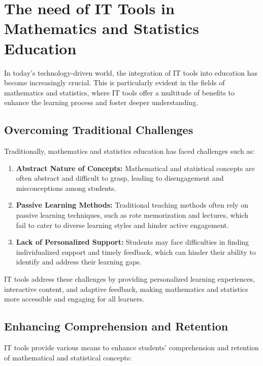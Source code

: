 \documentclass[20pt]{report}
\begin{document}
\section{The need of IT Tools in Mathematics and Statistics Education}

In today's technology-driven world, the integration of IT tools into education has become increasingly crucial. This is particularly evident in the fields of mathematics and statistics, where IT tools offer a multitude of benefits to enhance the learning process and foster deeper understanding.

\subsection{Overcoming Traditional Challenges}

Traditionally, mathematics and statistics education has faced challenges such as:

\begin{enumerate}

\item \textbf{Abstract Nature of Concepts:} Mathematical and statistical concepts are often abstract and difficult to grasp, leading to disengagement and misconceptions among students.

\item \textbf{Passive Learning Methods:} Traditional teaching methods often rely on passive learning techniques, such as rote memorization and lectures, which fail to cater to diverse learning styles and hinder active engagement.

\item \textbf{Lack of Personalized Support:} Students may face difficulties in finding individualized support and timely feedback, which can hinder their ability to identify and address their learning gaps.

\end{enumerate}

IT tools address these challenges by providing personalized learning experiences, interactive content, and adaptive feedback, making mathematics and statistics more accessible and engaging for all learners.

\subsection{Enhancing Comprehension and Retention}

IT tools provide various means to enhance students' comprehension and retention of mathematical and statistical concepts:
\end{document}
